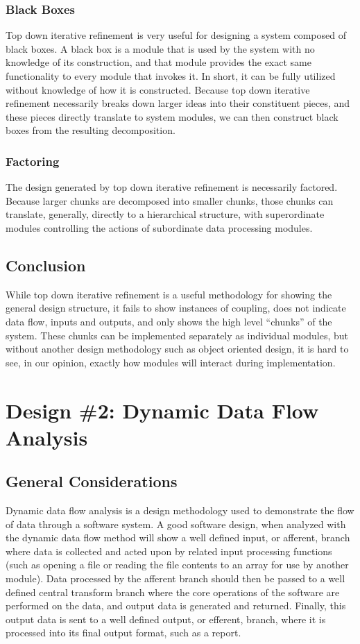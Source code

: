 \documentclass{article}
\begin{document}
		\subsubsection{Black Boxes}
			Top down iterative refinement is very useful for designing a system composed of black boxes. A black box is a module that is used by the system with no knowledge of its construction, and that module provides the exact same functionality to every module that invokes it. In short, it can be fully utilized without knowledge of how it is constructed. Because top down iterative refinement necessarily breaks down larger ideas into their constituent pieces, and these pieces directly translate to system modules, we can then construct black boxes from the resulting decomposition. 
		\subsubsection{Factoring}
			The design generated by top down iterative refinement is necessarily factored. Because larger chunks are decomposed into smaller chunks, those chunks can translate, generally, directly to a hierarchical structure, with superordinate modules controlling the actions of subordinate data processing modules. 
	\subsection{Conclusion}
		While top down iterative refinement is a useful methodology for showing the general design structure, it fails to show instances of coupling, does not indicate data flow, inputs and outputs, and only shows the high level ``chunks'' of the system. These chunks can be implemented separately as individual modules, but without another design methodology such as object oriented design, it is hard to see, in our opinion, exactly how modules will interact during implementation. 
%
%
\section{Design \#2: Dynamic Data Flow Analysis}
	\subsection{General Considerations}
		Dynamic data flow analysis is a design methodology used to demonstrate the flow of data through a software system. A good software design, when analyzed with the dynamic data flow method will show a well defined input, or afferent, branch where data is collected and acted upon by related input processing functions (such as opening a file or reading the file contents to an array for use by another module). Data processed by the afferent branch should then be passed to a well defined central transform branch where the core operations of the software are performed on the data, and output data is generated and returned. Finally, this output data is sent to a well defined output, or efferent, branch, where it is processed into its final output format, such as a report. 
	
\end{document}
